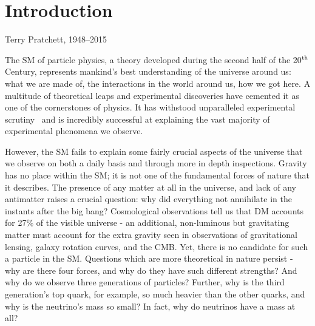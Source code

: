 \chapter{Introduction}
\label{chap:intro}



{Terry Pratchett, 1948--2015}

The \ac{SM} of particle physics, a theory developed during the second half of the 20$^{\rm th}$ Century, represents mankind's best understanding of the universe around us: what we are made of, the interactions in the world around us, how we got here. 
A multitude of theoretical leaps and experimental discoveries have cemented it as one of the cornerstones of physics. 
It has withstood unparalleled experimental scrutiny~\cite{PDG} and is incredibly successful at explaining the vast majority of experimental phenomena we observe.

However, the \ac{SM} fails to explain some fairly crucial aspects of the universe that we observe on both a daily basis and through more in depth inspections. 
Gravity has no place within the \ac{SM}; it is not one of the fundamental forces of nature that it describes. 
The presence of any matter at all in the universe, and lack of any antimatter raises a crucial question: why did everything not annihilate in the instants after the big bang?
Cosmological observations tell us that \ac{DM} accounts for 27\% of the visible universe - an additional, non-luminous but gravitating matter must account for the extra gravity seen in observations of gravitational lensing, galaxy rotation curves, and the \ac{CMB}.
Yet, there is no candidate for such a particle in the \ac{SM}. 
Questions which are more theoretical in nature persist - why are there four forces, and why do they have such different strengths? 
And why do we observe three generations of particles? Further, why is the third generation's top quark, for example, so much heavier than the other quarks, and why is the neutrino's mass so small? In fact, why do neutrinos have a mass at all?


